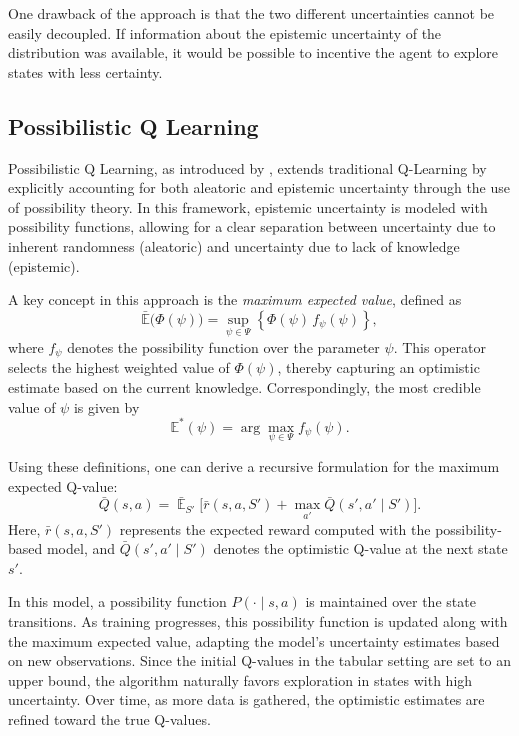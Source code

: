 \documentclass[12pt,a4paper]{report}
\DeclareMathOperator{\EX}{\mathbb{E}}
\begin{document}
One drawback of the approach is that the two different uncertainties cannot be easily decoupled. If information about the epistemic uncertainty of the distribution was available, it would be possible to incentive the agent to explore states with less certainty. 

\subsection{Possibilistic Q Learning}

Possibilistic Q Learning, as introduced by \cite{thomas2025}, extends traditional Q-Learning by explicitly accounting for both aleatoric and epistemic uncertainty through the use of possibility theory. In this framework, epistemic uncertainty is modeled with possibility functions, allowing for a clear separation between uncertainty due to inherent randomness (aleatoric) and uncertainty due to lack of knowledge (epistemic). \par

A key concept in this approach is the \emph{maximum expected value}, defined as
\[
\bar{\mathbb{E}}\big(\Phi(\psi)\big) = \sup_{\psi \in \Psi} \left\{ \Phi(\psi) \, f_\psi(\psi) \right\},
\]
where \(f_\psi\) denotes the possibility function over the parameter \(\psi\). This operator selects the highest weighted value of \(\Phi(\psi)\), thereby capturing an optimistic estimate based on the current knowledge. Correspondingly, the most credible value of \(\psi\) is given by
\[
\mathbb{E}^*(\psi) = \arg\max_{\psi \in \Psi} f_\psi(\psi). 
\] \par
 
Using these definitions, one can derive a recursive formulation for the maximum expected Q-value:
\[
  \bar{Q}(s,a) = \bar{\EX}_{S'}\Big[\bar{r}(s,a,S') + \max_{a'} \bar{Q}(s', a' \mid S') \Big].
\]
Here, \(\bar{r}(s,a,S')\) represents the expected reward computed with the possibility-based model, and \(\bar{Q}(s',a' \mid S')\) denotes the optimistic Q-value at the next state \(s'\). \par

In this model, a possibility function \(P(\cdot \mid s, a)\) is maintained over the state transitions. As training progresses, this possibility function is updated along with the maximum expected value, adapting the model’s uncertainty estimates based on new observations. Since the initial Q-values in the tabular setting are set to an upper bound, the algorithm naturally favors exploration in states with high uncertainty. Over time, as more data is gathered, the optimistic estimates are refined toward the true Q-values.
\end{document}
